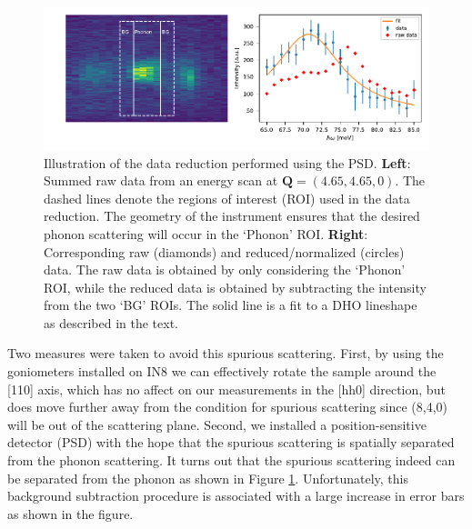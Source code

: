 \begin{figure}
    \centering
    \includegraphics[width=\textwidth]{fig/anomaly/data_reduction.pdf}
    \caption{Illustration of the data reduction performed using the PSD. \textbf{Left}: Summed raw data from an energy scan at $\bm{Q}=(4.65,4.65,0)$. The dashed lines denote the regions of interest (ROI) used in the data reduction. The geometry of the instrument ensures that the desired phonon scattering will occur in the `Phonon' ROI. \textbf{Right}: Corresponding raw (diamonds) and reduced/normalized (circles) data. The raw data is obtained by only considering the `Phonon' ROI, while the reduced data is obtained by subtracting the intensity from the two `BG' ROIs. The solid line is a fit to a DHO lineshape as described in the text.}
    \label{fig:psd_data_reduction}
\end{figure}

Two measures were taken to avoid this spurious scattering. First, by using the goniometers installed on IN8 we can effectively rotate the sample around the [110] axis, which has no affect on our measurements in the [hh0] direction, but does move further away from the condition for spurious scattering since (8,4,0) will be out of the scattering plane. Second, we installed a position-sensitive detector (PSD) with the hope that the spurious scattering is spatially separated from the phonon scattering. It turns out that the spurious scattering indeed can be separated from the phonon as shown in Figure \ref{fig:psd_data_reduction}. Unfortunately, this background subtraction procedure is associated with a large increase in error bars as shown in the figure.

